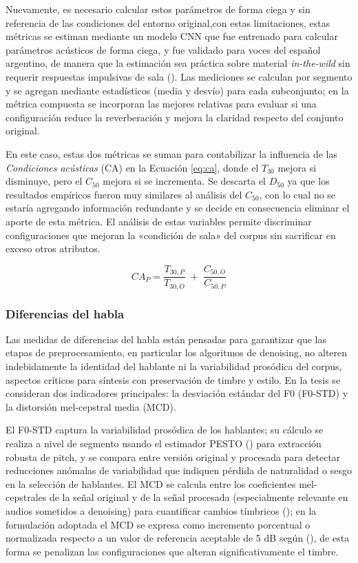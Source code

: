 Nuevamente, es necesario calcular estos parámetros de forma ciega y sin referencia de las condiciones del entorno original,con estas limitaciones, estas métricas se estiman mediante un modelo CNN que fue entrenado para calcular parámetros acústicos de forma ciega, y fue validado para voces del español argentino, de manera que la estimación sea práctica sobre material \emph{in-the-wild} sin requerir respuestas impulsivas de sala (\cite{Maxi2}). Las mediciones se calculan por segmento y se agregan mediante estadísticos (media y desvío) para cada subconjunto; en la métrica compuesta se incorporan las mejores relativas para evaluar si una configuración reduce la reverberación y mejora la claridad respecto del conjunto original. 

En este caso, estas dos métricas se suman para contabilizar la influencia de las \emph{Condiciones acústicas} (CA) en la Ecuación \ref{eq:ca}, donde el $T_{30}$ mejora si disminuye, pero el $C_{50}$ mejora si se incrementa. Se descarta el $D_{50}$ ya que los resultados empíricos fueron muy similares al análisis del $C_{50}$, con lo cual no se estaría agregando información redundante y se decide en consecuencia eliminar el aporte de esta métrica. El análisis de estas variables permite discriminar configuraciones que mejoran la «condición de sala» del corpus sin sacrificar en exceso otros atributos.

\begin{equation}
\label{eq:ca}
CA_P = 
\frac{T_{30,P}}{T_{30,O}}
\;+\; \frac{C_{50,O}}{C_{50,P}}
\end{equation}

\subsubsection{Diferencias del habla}
Las medidas de diferencias del habla están pensadas para garantizar que las etapas de preprocesamiento, en particular los algoritmos de denoising, no alteren indebidamente la identidad del hablante ni la variabilidad prosódica del corpus, aspectos críticos para síntesis con preservación de timbre y estilo. En la tesis se consideran dos indicadores principales: la desviación estándar del F0 (F0-STD) y la distorsión mel-cepstral media (MCD). 

El F0-STD captura la variabilidad prosódica de los hablantes; su cálculo se realiza a nivel de segmento usando el estimador PESTO (\cite{PESTO}) para extracción robusta de pitch, y se compara entre versión original y procesada para detectar reducciones anómalas de variabilidad que indiquen pérdida de naturalidad o sesgo en la selección de hablantes. El MCD se calcula entre los coeficientes mel-cepstrales de la señal original y de la señal procesada (especialmente relevante en audios sometidos a denoising) para cuantificar cambios tímbricos (\cite{mcd_metric}); en la formulación adoptada el MCD se expresa como incremento porcentual o normalizada respecto a un valor de referencia aceptable de 5 dB según (\cite{survey2}), de esta forma se penalizan las configuraciones que alteran significativamente el timbre. 

